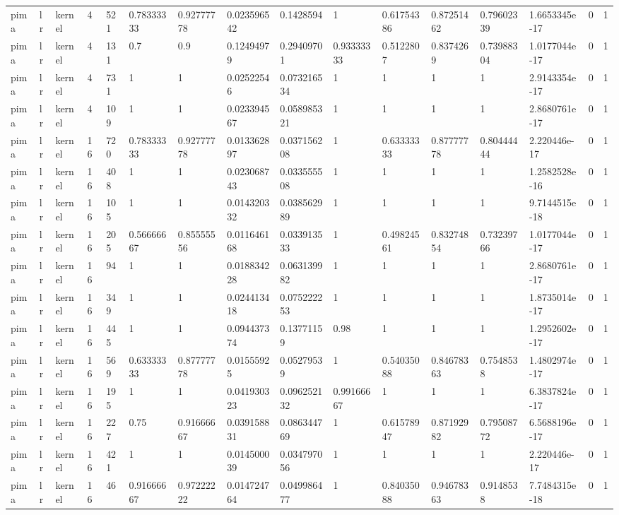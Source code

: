 \begin{tabular}{llllllllllllllll}
pima & lr & kernel & 4 & 521 & 0.78333333 & 0.92777778 & 0.023596542 & 0.1428594 & 1 & 0.61754386 & 0.87251462 & 0.79602339 & 1.6653345e-17 & 0 & 1 \\
pima & lr & kernel & 4 & 131 & 0.7 & 0.9 & 0.12494979 & 0.29409701 & 0.93333333 & 0.5122807 & 0.8374269 & 0.73988304 & 1.0177044e-17 & 0 & 1 \\
pima & lr & kernel & 4 & 731 & 1 & 1 & 0.02522546 & 0.073216534 & 1 & 1 & 1 & 1 & 2.9143354e-17 & 0 & 1 \\
pima & lr & kernel & 4 & 109 & 1 & 1 & 0.023394567 & 0.058985321 & 1 & 1 & 1 & 1 & 2.8680761e-17 & 0 & 1 \\
pima & lr & kernel & 16 & 720 & 0.78333333 & 0.92777778 & 0.013362897 & 0.037156208 & 1 & 0.63333333 & 0.87777778 & 0.80444444 & 2.220446e-17 & 0 & 1 \\
pima & lr & kernel & 16 & 408 & 1 & 1 & 0.023068743 & 0.033555508 & 1 & 1 & 1 & 1 & 1.2582528e-16 & 0 & 1 \\
pima & lr & kernel & 16 & 105 & 1 & 1 & 0.014320332 & 0.038562989 & 1 & 1 & 1 & 1 & 9.7144515e-18 & 0 & 1 \\
pima & lr & kernel & 16 & 205 & 0.56666667 & 0.85555556 & 0.011646168 & 0.033913533 & 1 & 0.49824561 & 0.83274854 & 0.73239766 & 1.0177044e-17 & 0 & 1 \\
pima & lr & kernel & 16 & 94 & 1 & 1 & 0.018834228 & 0.063139982 & 1 & 1 & 1 & 1 & 2.8680761e-17 & 0 & 1 \\
pima & lr & kernel & 16 & 349 & 1 & 1 & 0.024413418 & 0.075222253 & 1 & 1 & 1 & 1 & 1.8735014e-17 & 0 & 1 \\
pima & lr & kernel & 16 & 445 & 1 & 1 & 0.094437374 & 0.13771159 & 0.98 & 1 & 1 & 1 & 1.2952602e-17 & 0 & 1 \\
pima & lr & kernel & 16 & 569 & 0.63333333 & 0.87777778 & 0.01555925 & 0.05279539 & 1 & 0.54035088 & 0.84678363 & 0.7548538 & 1.4802974e-17 & 0 & 1 \\
pima & lr & kernel & 16 & 195 & 1 & 1 & 0.041930323 & 0.096252132 & 0.99166667 & 1 & 1 & 1 & 6.3837824e-17 & 0 & 1 \\
pima & lr & kernel & 16 & 227 & 0.75 & 0.91666667 & 0.039158831 & 0.086344769 & 1 & 0.61578947 & 0.87192982 & 0.79508772 & 6.5688196e-17 & 0 & 1 \\
pima & lr & kernel & 16 & 421 & 1 & 1 & 0.014500039 & 0.034797056 & 1 & 1 & 1 & 1 & 2.220446e-17 & 0 & 1 \\
pima & lr & kernel & 16 & 46 & 0.91666667 & 0.97222222 & 0.014724764 & 0.049986477 & 1 & 0.84035088 & 0.94678363 & 0.9148538 & 7.7484315e-18 & 0 & 1 \\

\end{tabular}
